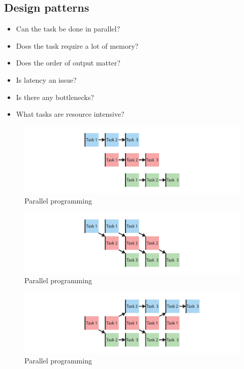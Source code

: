 \subsection{Design patterns}
\todo
\begin{itemize}
    \item Can the task be done in parallel?
    \item Does the task require a lot of memory?
    \item Does the order of output matter?
    \item Is latency an issue?
    \item Is there any bottlenecks?
    \item What tasks are resource intensive?
\end{itemize}
\begin{figure}[H]
    \centering
    \includegraphics[width=\textwidth]{figures/concurrency/concurrent_overlap.pdf}
    \caption{Parallel programming}
    \label{fig:concurrency_concurrent_overlap}
\end{figure}

\begin{figure}[H]
    \centering
    \includegraphics[width=\textwidth]{figures/concurrency/thread_per_task.pdf}
    \caption{Parallel programming}
    \label{fig:concurrency_thread_per_task}
\end{figure}


\begin{figure}[H]
    \centering
    \includegraphics[width=\textwidth]{figures/concurrency/distribute.pdf}
    \caption{Parallel programming}
    \label{fig:concurrency_distribute}
\end{figure}


